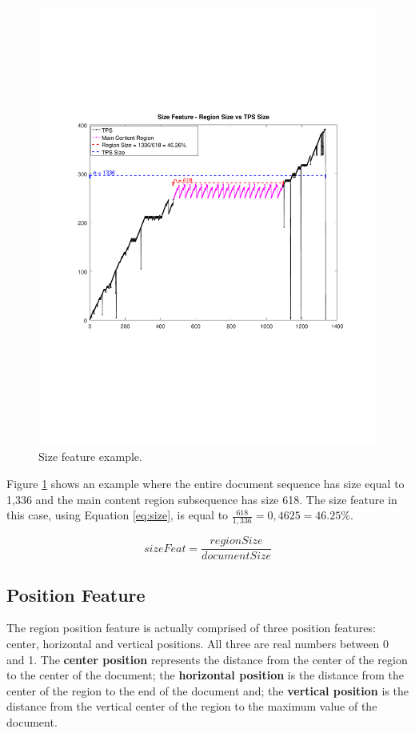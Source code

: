 \begin{figure}[h]
  \centering
     \includegraphics[trim={2.5cm 7.4cm 2.2cm 7.4cm}, clip,  width=\columnwidth]{img/size.pdf}
  \caption{Size feature example.}
  \label{fig:size}
\end{figure}

Figure \ref{fig:size} shows an example where the entire document sequence has
size equal to 1,336 and the main content region subsequence has size 618. The
size feature in this case, using Equation \ref{eq:size}, is equal to
$\frac{618}{1,336} = 0,4625 = 46.25\%$.

\begin{equation}\label{eq:size}
    sizeFeat = \frac{regionSize}{documentSize}
\end{equation}

\subsection{Position Feature}\label{ss:pos}
The region position feature is actually comprised of three position features:
center, horizontal and vertical positions. All three are real numbers between 0
and 1. The \textbf{center position} represents the distance from the center of
the region to the center of the document; the \textbf{horizontal position} is
the distance from the center of the region to the end of the document and; the
\textbf{vertical position} is the distance from the vertical center of the
region to the maximum value of the document.

